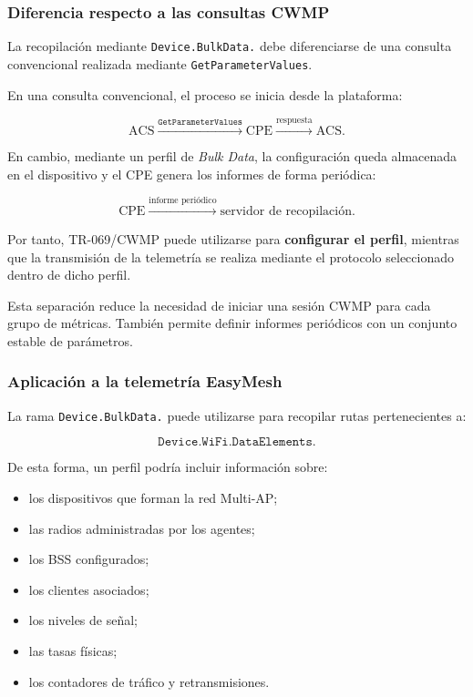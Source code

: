 \subsubsection*{Diferencia respecto a las consultas CWMP}

La recopilación mediante \texttt{Device.BulkData.} debe diferenciarse de
una consulta convencional realizada mediante
\texttt{GetParameterValues}.

En una consulta convencional, el proceso se inicia desde la plataforma:

\[
    \text{ACS}
    \xrightarrow{\texttt{GetParameterValues}}
    \text{CPE}
    \xrightarrow{\text{respuesta}}
    \text{ACS}.
\]

En cambio, mediante un perfil de \textit{Bulk Data}, la configuración
queda almacenada en el dispositivo y el CPE genera los informes de forma
periódica:

\[
    \text{CPE}
    \xrightarrow{\text{informe periódico}}
    \text{servidor de recopilación}.
\]

Por tanto, TR-069/CWMP puede utilizarse para
\textbf{configurar el perfil}, mientras que la transmisión de la
telemetría se realiza mediante el protocolo seleccionado dentro de dicho
perfil.

Esta separación reduce la necesidad de iniciar una sesión CWMP para cada
grupo de métricas. También permite definir informes periódicos con un
conjunto estable de parámetros.


\subsubsection*{Aplicación a la telemetría EasyMesh}

La rama \texttt{Device.BulkData.} puede utilizarse para recopilar rutas
pertenecientes a:

\[
    \texttt{Device.WiFi.DataElements.}
\]

De esta forma, un perfil podría incluir información sobre:

\begin{itemize}
    \item los dispositivos que forman la red Multi-AP;
    \item las radios administradas por los agentes;
    \item los BSS configurados;
    \item los clientes asociados;
    \item los niveles de señal;
    \item las tasas físicas;
    \item los contadores de tráfico y retransmisiones.
\end{itemize}

